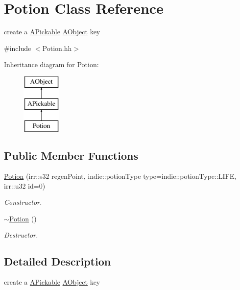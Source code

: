 \hypertarget{classPotion}{}\section{Potion Class Reference}
\label{classPotion}


create a \hyperlink{classAPickable}{A\+Pickable} \hyperlink{classAObject}{A\+Object} key  




{\ttfamily \#include $<$Potion.\+hh$>$}

Inheritance diagram for Potion\+:\begin{figure}[H]
\begin{center}
\leavevmode
\includegraphics[height=3.000000cm]{classPotion}
\end{center}
\end{figure}
\subsection*{Public Member Functions}
\begin{DoxyCompactItemize}
\item 
\hyperlink{classPotion_a2fae017a2dbe6fd82269d19a51908959}{Potion} (irr\+::s32 regen\+Point, indie\+::potion\+Type type=indie\+::potion\+Type\+::\+L\+I\+FE, irr\+::u32 id=0)
\begin{DoxyCompactList}\small\item\em Constructor. \end{DoxyCompactList}\item 
\hyperlink{classPotion_a8730c8052ec698171885bb5dacda9cca}{$\sim$\+Potion} ()
\begin{DoxyCompactList}\small\item\em Destructor. \end{DoxyCompactList}\end{DoxyCompactItemize}


\subsection{Detailed Description}
create a \hyperlink{classAPickable}{A\+Pickable} \hyperlink{classAObject}{A\+Object} key 

